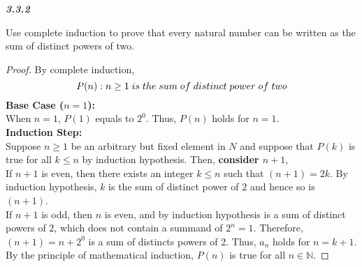 \documentclass{article}
\begin{document}
\begin{flushleft}
\begin{enumerate}
\begin{flushleft}
		\end{flushleft}
		
		\textbf{\textit{3.3.2}}
		\begin{flushleft}
		Use complete induction to prove that every natural number can be written as the sum of distinct powers of two.
			\\
			\begin{proof}
				By complete induction, \\
				\[P(n): n \geq 1\thickspace is\thickspace the\thickspace sum\thickspace of\thickspace distinct\thickspace power\thickspace of\thickspace two\]
				\textbf{Base Case ($n = 1$):}
				\\ \vspace{2mm}
				When $n = 1$, $P(1)$ equals to $2^0$. Thus, $P(n)$ holds for $n=1$.
				\\ \vspace{2mm}
				\textbf{Induction Step:}
				\\ \vspace{2mm}
				Suppose $n \geq 1$ be an arbitrary but fixed element in $N$ and suppose that $P(k)$ is true for all $k \leq n$ by induction hypothesis. Then, \textbf{consider $n+1$},\\
				\vspace{2mm}
				If $n+1$ is even, then there exists an integer $k \leq n$ such that $(n+1) = 2k$. By induction hypothesis, $k$ is the sum of distinct power of $2$ and hence so is $(n+1)$.
				\\ \vspace{2mm}
				If $n+1$ is odd, then $n$ is even, and by induction hypothesis is a sum of distinct powers of $2$, which does not contain a summand of $2^n=1$. Therefore, $(n+1) = n + 2^0$ is a sum of distincts powers of 2. 
				Thus, $a_n$ holds for $n=k+1$.
				\\ \vspace{2mm}
				By the principle of mathematical induction, $P(n)$ is true for all $n \in \mathbb{N}$.
			\end{proof}
		\end{flushleft}
		

\end{enumerate}
\end{flushleft}
\end{document}
